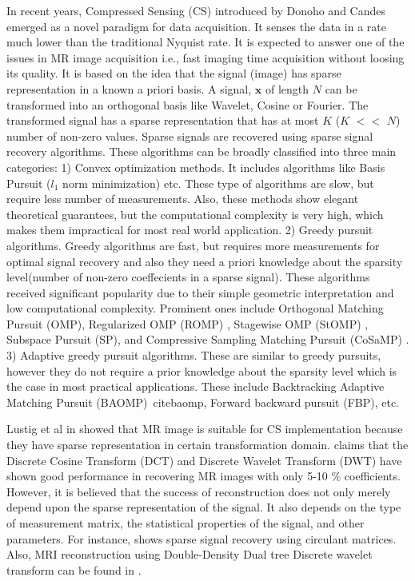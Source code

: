 \documentclass[11pt,conference]{IEEEtran}
\begin{document}
\par In recent years, Compressed Sensing (CS) introduced by Donoho and Candes \cite{dld,ejt} emerged as a novel paradigm for data acquisition. It senses the data in a rate much lower than the traditional Nyquist rate. It is expected to answer one of the issues in MR image acquisition i.e., fast imaging time acquisition without loosing its quality. It is based on the idea that the signal (image) has sparse representation in a known a priori basis. A signal, $\mathbf{x}$ of length $N$ can be transformed into an orthogonal basis like Wavelet, Cosine or Fourier. The transformed signal has a sparse representation that has at most $K$ ($K$ $<<$ $N$) number of non-zero values. Sparse signals are recovered using sparse signal recovery algorithms. These algorithms can be broadly classified into three main categories: 1) Convex optimization methods. It includes algorithms like Basis Pursuit ($l_1$ norm minimization)\cite{sdma} etc. These type of algorithms are slow, but require less number of measurements\cite{et,sdma}. 
Also, these methods show elegant theoretical guarantees, but the computational complexity is very high, which makes them impractical for most real world application. 2) Greedy pursuit algorithms. Greedy algorithms are fast, but requires more measurements for optimal signal recovery and also they need a priori knowledge about the sparsity level(number of non-zero coeffecients in a sparse signal). These algorithms received significant popularity due to their simple geometric interpretation and low computational complexity. Prominent ones include Orthogonal Matching Pursuit (OMP)\cite{omp}, Regularized OMP (ROMP) \cite{romp}, Stagewise OMP (StOMP) \cite{stomp}, Subspace Pursuit (SP)\cite{sp}, and Compressive Sampling Matching Pursuit (CoSaMP) \cite{cosamp}. 3) Adaptive greedy pursuit algorithms. These are similar to greedy pursuits, however they do not require a prior knowledge about the sparsity level which is the case in most practical applications. These include Backtracking Adaptive Matching Pursuit (BAOMP)\
cite{baomp}, Forward backward pursuit (FBP)\cite{fbp}, etc.
 
\par Lustig et al in \cite{lustig} showed that MR image is suitable for CS implementation because they have sparse representation in certain transformation domain. \cite{lustig} claims that the Discrete Cosine Transform (DCT) and Discrete Wavelet Transform (DWT) have shown good performance in recovering MR images with only 5-10 $\%$ coefficients. However, it is believed that the success of reconstruction does not only merely depend upon the sparse representation of the signal. It also depends on the type of measurement matrix, the statistical properties of the signal, and other parameters. For instance, \cite{circulant} shows sparse signal recovery using circulant matrices. Also, MRI reconstruction using Double-Density Dual tree Discrete wavelet transform can be found in \cite{dualtree}.  
\end{document}
